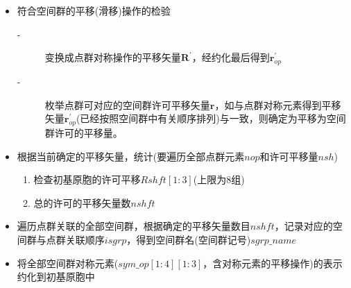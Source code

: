 \documentclass{article}      %
\begin{document}
\begin{itemize}
		校正坐标系贡献后，点群对称操作的平移矢量$\mathbf{R}^{\prime}$为
		\begin{displaymath}
			\mathbf{R}^{\prime}=\mathbf{r}^{\prime}+\mathbf{R}_{sh}^{\mathrm{coor}}=\mathbf{r}^{\prime}+(\mathbf{g}-\mathbf{E})^{-1}(\mathbf{r}-\mathbf{r}^{\prime})
		\end{displaymath}

	\item 符合空间群的平移(滑移)操作的检验
		\begin{description}
			\item[-] 变换成点群对称操作的平移矢量$\mathbf{R}^{\prime}$，经约化最后得到$\mathbf{r}_{op}^{\prime}$
			\item[-] 枚举点群可对应的空间群许可平移矢量$\mathbf{r}$，如与点群对称元素得到平移矢量$\mathbf{r}_{op}^{\prime}$(已经按照空间群中有关顺序排列)与一致，则确定为平移为空间群许可的平移量。
		\end{description}
	\item 根据当前确定的平移矢量，统计(要遍历全部点群元素$\mathit{nop}$和许可平移量$\mathit{nsh}$)
		\begin{enumerate}
			\item 检查初基原胞的许可平移$Rshft[1:3]$(上限为8组)
			\item 总的许可的平移矢量数$\mathit{nshft}$
		\end{enumerate}
	\item 遍历点群关联的全部空间群，根据确定的平移矢量数目$\mathit{nshft}$，记录对应的空间群与点群关联顺序$\mathit{isgrp}$，得到空间群名(空间群记号)$\mathit{sgrp\_name}$
	\item 将全部空间群对称元素($\mathit{sym\_op}[1:4][1:3]$，含对称元素的平移操作)的表示约化到初基原胞中
\end{itemize}
\end{document}
